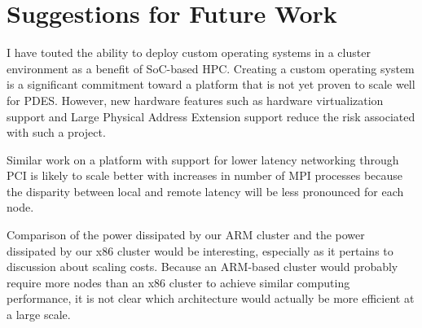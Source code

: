 \documentclass[11pt]{book}
\begin{document}
\section{Suggestions for Future Work}

I have touted the ability to deploy custom operating systems in a cluster
environment as a benefit of SoC-based HPC. Creating a custom operating
system is a significant commitment toward a platform that is not yet proven to
scale well for PDES. However, new hardware features such as hardware
virtualization support and Large Physical Address Extension support reduce the
risk associated with such a project.

Similar work on a platform with support for lower latency networking through PCI
is likely to scale better with increases in number of MPI processes because the
disparity between local and remote latency will be less pronounced for each
node.

Comparison of the power dissipated by our ARM cluster and the power dissipated
by our x86 cluster would be interesting, especially as it pertains to discussion
about scaling costs. Because an ARM-based cluster would probably require more
nodes than an x86 cluster to achieve similar computing performance, it is not
clear which architecture would actually be more efficient at a large scale.

\newpage
 

\end{document}
